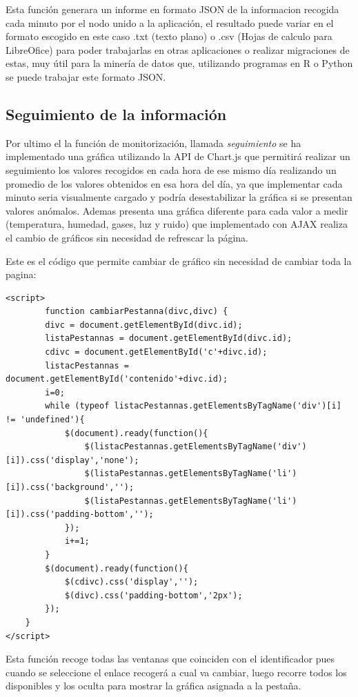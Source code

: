 Esta función generara un informe en formato JSON de la informacion recogida cada minuto por el nodo unido a la aplicación, el resultado puede variar en el formato escogido en este caso .txt (texto plano) o .csv (Hojas de calculo para LibreOfice) para poder trabajarlas en otras aplicaciones o realizar migraciones de estas, muy útil para la minería de datos que, utilizando programas en R o Python se puede trabajar este formato JSON.

\subsection{Seguimiento de la información}

Por ultimo el la función de monitorización, llamada \textit{seguimiento} se ha implementado una gráfica utilizando la API de Chart.js que permitirá realizar un seguimiento los valores recogidos en cada hora de ese mismo día realizando un promedio de los valores obtenidos en esa hora del día, ya que implementar cada minuto seria visualmente cargado y podría desestabilizar la gráfica si se presentan valores anómalos. 
Ademas presenta una gráfica diferente para cada valor a medir (temperatura, humedad, gases, luz y ruido) que implementado con AJAX realiza el cambio de gráficos sin necesidad de refrescar la página.

Este es el código que permite cambiar de gráfico sin necesidad de cambiar toda la pagina\cite{ajax}:\\

\begin{lstlisting}[caption=Selector de Graficos, label=graficsel]
 <script>
	    function cambiarPestanna(divc,divc) {
	    divc = document.getElementById(divc.id);
	    listaPestannas = document.getElementById(divc.id);
	    cdivc = document.getElementById('c'+divc.id);
	    listacPestannas = document.getElementById('contenido'+divc.id);
	    i=0;
		while (typeof listacPestannas.getElementsByTagName('div')[i] != 'undefined'){
		    $(document).ready(function(){
			    $(listacPestannas.getElementsByTagName('div')[i]).css('display','none');
			    $(listaPestannas.getElementsByTagName('li')[i]).css('background','');
			    $(listaPestannas.getElementsByTagName('li')[i]).css('padding-bottom','');
		    });
		    i+=1;
	    }
	    $(document).ready(function(){
		    $(cdivc).css('display','');
		    $(divc).css('padding-bottom','2px');
	    });
    }
</script>
\end{lstlisting}

Esta función recoge todas las ventanas que coinciden con el identificador pues cuando se seleccione el enlace recogerá a cual va cambiar, luego recorre todos los disponibles y los oculta para mostrar la gráfica asignada a la pestaña.


